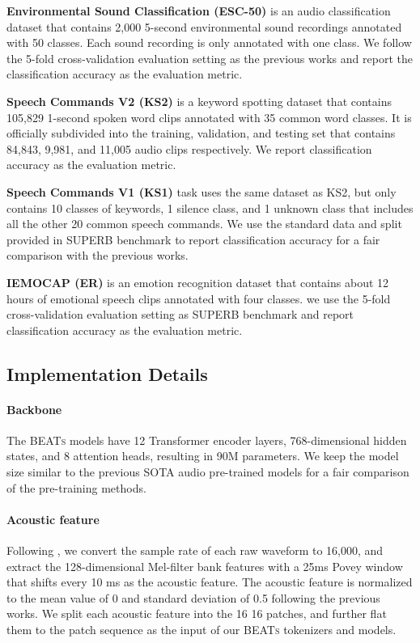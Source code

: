 \documentclass{article}
\theoremstyle{plain}
\theoremstyle{definition}
\theoremstyle{remark}
\newcommand\our{\textsc{BEATs}}
\begin{document}
\textbf{Environmental Sound Classification (ESC-50)} \citep{piczak2015esc} is an audio classification dataset that contains 2,000 5-second environmental sound recordings annotated with 50 classes. Each sound recording is only annotated with one class. We follow the 5-fold cross-validation evaluation setting as the previous works and report the classification accuracy as the evaluation metric.

\textbf{Speech Commands V2 (KS2)} \citep{warden2018speech} is a keyword spotting dataset that contains  105,829 1-second spoken word clips annotated with 35 common word classes. It is officially subdivided into the training, validation, and testing set that contains 84,843, 9,981, and 11,005 audio clips respectively. We report classification accuracy as the evaluation metric.

\textbf{Speech Commands V1 (KS1)} \citep{warden2018speech} task uses the same dataset as KS2, but only contains 10 classes of keywords, 1 silence class, and 1 unknown class that includes all the other 20 common speech commands. We use the standard data and split provided in SUPERB benchmark \citep{SUPERB} to report classification accuracy for a fair comparison with the previous works.

\textbf{IEMOCAP (ER)} \citep{busso2008iemocap} is an emotion recognition dataset that contains about 12 hours of emotional speech clips annotated with four classes. we use the 5-fold cross-validation evaluation setting as SUPERB benchmark \citep{SUPERB} and report classification accuracy as the evaluation metric.

\subsection{Implementation Details}

\paragraph{Backbone}
The \our{} models have 12 Transformer encoder layers, 768-dimensional hidden states, and 8 attention heads, resulting in 90M parameters.
We keep the model size similar to the previous SOTA audio pre-trained models \citep{xu2022masked,chong2022masked} for a fair comparison of the pre-training methods.

\paragraph{Acoustic feature}
Following \citep{gong2021ast,gong2022ssast}, we convert the sample rate of each raw waveform to 16,000, and extract the 128-dimensional Mel-filter bank features with a 25ms Povey window that shifts every 10 ms as the acoustic feature. 
The acoustic feature is normalized to the mean value of 0 and standard deviation of 0.5 following the previous works.
We split each acoustic feature into the 16   16 patches, and further flat them to the patch sequence as the input of our \our{} tokenizers and models.
\end{document}
